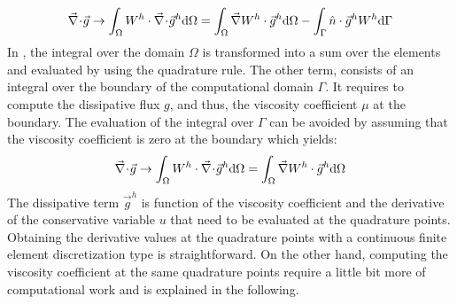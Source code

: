 %
\begin{equation}\label{eq:diss_term_sct2}
\vec{\nabla}\! \cdot \! \vec{g} \rightarrow \int_\Omega W^h \cdot \vec{\nabla}\! \cdot \! \vec{g}^h\text{d}\Omega  = \int_\Omega \vec{\nabla} W^h \cdot \vec{g}^h\text{d}\Omega - \int_\Gamma \hat{n} \cdot \vec{g}^h W^h \text{d}\Gamma
\end{equation} 
%
In , the integral over the domain $\Omega$ is transformed into a sum over the elements and evaluated by using the quadrature rule. The other term, consists of an integral over the boundary of the computational domain $\Gamma$. It requires to compute the dissipative flux $g$, and thus, the viscosity coefficient $\mu$ at the boundary. The evaluation of the integral over $\Gamma$ can be avoided by assuming that the viscosity coefficient is zero at the boundary which yields:
\begin{equation}\label{eq:diss_term2_sct2}
\vec{\nabla}\! \cdot \! \vec{g} \rightarrow \int_\Omega W^h \cdot \vec{\nabla}\! \cdot \! \vec{g}^h\text{d}\Omega  = \int_\Omega \vec{\nabla} W^h \cdot \vec{g}^h\text{d}\Omega
\end{equation} 
%
The dissipative term $\vec{g}^h$ is function of the viscosity coefficient and the derivative of the conservative variable $u$ that need to be evaluated at the quadrature points. Obtaining the derivative values at the quadrature points with a continuous finite element discretization type is straightforward. On the other hand, computing the viscosity coefficient at the same quadrature points require a little bit more of computational work and is explained in the following. \\

